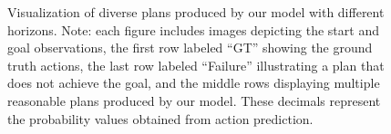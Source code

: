 \begin{figure}[htbp]
    \centering
    
    \vspace{1em}
    
    
    \vspace{1em}
    
    
    \vspace{1em}
    
    
    \caption{Visualization of diverse plans produced by our model with different horizons. Note: each figure includes images depicting the start and goal observations, the first row labeled ``GT'' showing the ground truth actions, the last row labeled ``Failure'' illustrating a plan that does not achieve the goal, and the middle rows displaying multiple reasonable plans produced by our model. These decimals represent the probability values obtained from action prediction. }
    \label{fig:visual-all}
\end{figure}